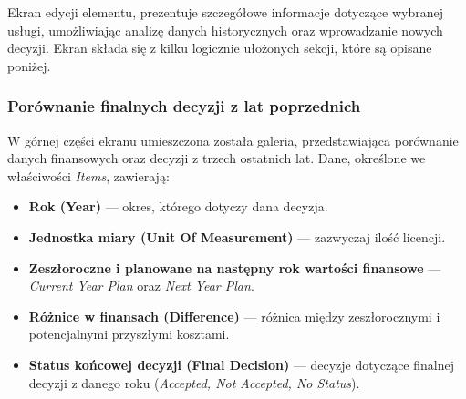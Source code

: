 Ekran edycji elementu, prezentuje szczegółowe informacje dotyczące wybranej usługi, umożliwiając analizę danych historycznych oraz wprowadzanie nowych decyzji. Ekran składa się z kilku logicznie ułożonych sekcji, które są opisane poniżej.


\subsubsection*{Porównanie finalnych decyzji z lat poprzednich}

W górnej części ekranu umieszczona została galeria, przedstawiająca porównanie danych finansowych oraz decyzji z trzech ostatnich lat. Dane, określone we właściwości \emph{Items}, zawierają:

\begin{itemize}
\item \textbf{Rok (Year)} — okres, którego dotyczy dana decyzja.
\item \textbf{Jednostka miary (Unit Of Measurement)} — zazwyczaj ilość licencji.
\item \textbf{Zeszłoroczne i planowane na następny rok wartości finansowe} — \emph{Current Year Plan} oraz \emph{Next Year Plan}.
\item \textbf{Różnice w finansach (Difference)} — różnica między zeszłorocznymi i potencjalnymi przyszłymi kosztami.
\item \textbf{Status końcowej decyzji (Final Decision)} — decyzje dotyczące finalnej decyzji z danego roku (\emph{Accepted, Not Accepted, No Status}).
\end{itemize}




